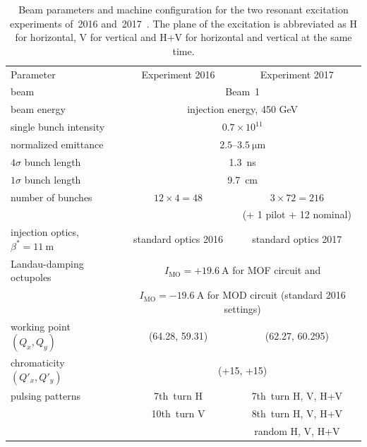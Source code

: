 \documentclass[aps
,prstab
,reprint
,longbibliography
,preprintnumbers
,showkeys
,amsfonts,amssymb,amsmath
,floatfix
]{revtex4-1}
\newcommand{\q}[2]{\ensuremath{#1\ \mathrm{#2}}} %
\begin{document}
\begin{table}
  \caption{Beam parameters and machine configuration for the two
    resonant excitation experiments of~2016
    and~2017~\cite{resexmd2016, resexmd2017}. The plane of the
    excitation is abbreviated as H for horizontal, V for vertical and
    H+V for horizontal and vertical at the same time.}
  \label{tab:md_param}
  \begin{ruledtabular}
    \begin{tabular}{lcc}
      Parameter & Experiment 2016 & Experiment 2017  \\
      \colrule
      beam &\multicolumn{2}{c}{Beam~1} \\
      beam energy &\multicolumn{2}{c}{injection energy, 450 GeV} \\\hline
      single bunch intensity &\multicolumn{2}{c}{$0.7\times10^{11}$} \\
      normalized emittance &\multicolumn{2}{c}{$2.5$--\q{3.5}{\mu m}} \\
      $4\sigma$ bunch length & \multicolumn{2}{c}{1.3~ns}\\
      $1\sigma$ bunch length & \multicolumn{2}{c}{9.7~cm}\\
      number of bunches & $12 \times 4 = 48$ & $3 \times 72 = 216$ \\
                &  & (+ 1 pilot + 12 nominal) \\\hline
      injection optics, $\beta^* = \q{11}{m}$ & standard optics 2016 & standard optics 2017\\
      Landau-damping octupoles  & \multicolumn{2}{c}{$I_{\mathrm{MO}}
                                  = \q{+19.6}{A}$ for MOF circuit and}\\
                & \multicolumn{2}{c}{$I_{\mathrm{MO}} = \q{-19.6}{A}$
                  for MOD circuit (standard 2016 settings)} \\ \hline
      working point $(Q_x, Q_y)$ & (64.28, 59.31) & (62.27, 60.295) \\
      chromaticity $(Q'_x, Q'_y)$ & \multicolumn{2}{c}{(+15, +15)}\\ \hline
      pulsing patterns  & 7th~turn H & 7th~turn H, V, H+V \\
                & 10th~turn V & 8th~turn H, V, H+V \\
                & &  random  H, V, H+V\\
    \end{tabular}
  \end{ruledtabular}
\end{table}
\end{document}

